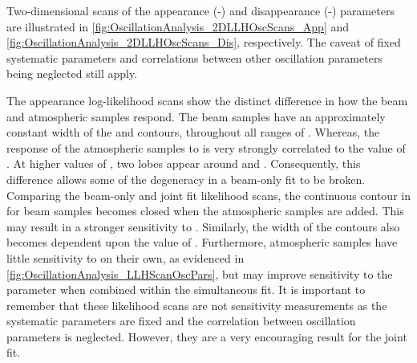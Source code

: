 
Two-dimensional scans of the appearance (-) and disappearance (-) parameters are illustrated in \autoref{fig:OscillationAnalysis_2DLLHOscScans_App} and \autoref{fig:OscillationAnalysis_2DLLHOscScans_Dis}, respectively. The caveat of fixed systematic parameters and correlations between other oscillation parameters being neglected still apply.

The appearance log-likelihood scans show the distinct difference in how the beam and atmospheric samples respond. The beam samples have an approximately constant width of the \quickmath{2\sigma} and \quickmath{3\sigma} contours, throughout all ranges of . Whereas, the response of the atmospheric samples to  is very strongly correlated to the value of . At higher values of , two lobes appear around  and . Consequently, this difference allows some of the degeneracy in a beam-only fit to be broken. Comparing the beam-only and joint fit likelihood scans, the \quickmath{2\sigma} continuous contour in  for beam samples becomes closed when the atmospheric samples are added. This may result in a stronger sensitivity to . Similarly, the width of the \quickmath{3\sigma} contours also becomes dependent upon the value of . Furthermore, atmospheric samples have little sensitivity to  on their own, as evidenced in \autoref{fig:OscillationAnalysis_LLHScanOscPars}, but may improve sensitivity to the parameter when combined within the simultaneous fit. It is important to remember that these likelihood scans are not sensitivity measurements as the systematic parameters are fixed and the correlation between oscillation parameters is neglected. However, they are a very encouraging result for the joint fit. 


